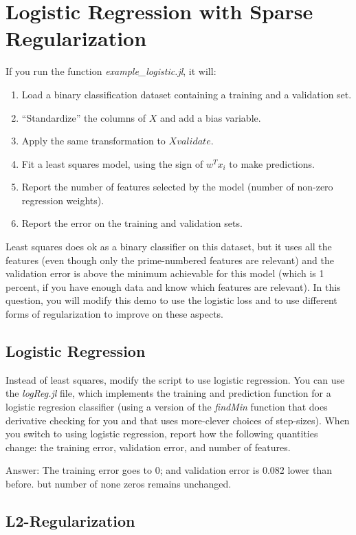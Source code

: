 \documentclass{article}
\def\ans#1{\par\gre{Answer: #1}}
\def\blu#1{{\color{blu}#1}}
\def\gre#1{{\color{gre}#1}}
\def\enum#1{\begin{enumerate}#1\end{enumerate}}
\begin{document}
\section{Logistic Regression with Sparse Regularization}

If you run the function \emph{example\_logistic.jl}, it will:
\enum{
\item Load a binary classification dataset containing a training and a validation set.
\item ``Standardize'' the columns of $X$ and add a bias variable.
\item Apply the same transformation to $Xvalidate$.
\item Fit a least squares model, using the sign of $w^Tx_i$ to make predictions.
\item Report the number of features selected by the model (number of non-zero regression weights).
\item Report the error on the training and validation sets.
}
Least squares does ok as a binary classifier on this dataset, but it uses all the features (even though only the prime-numbered features are relevant) and the validation error is above the minimum achievable for this model (which is 1 percent, if you have enough data and know which features are relevant). In this question, you will modify this demo to use the logistic loss and to use different forms of regularization to improve on these aspects.


\subsection{Logistic Regression}

Instead of least squares, modify the script to use logistic regression. You can use the \emph{logReg.jl} file, which implements the training and prediction function for a logistic regresion classifier (using a  version of the \emph{findMin} function that does derivative checking for you and that uses more-clever choices of step-sizes). When you switch to using logistic regression, \blu{report how the following quantities change: the training error, validation error, and number of features}.
\ans{
    The training error goes to 0; and validation error is 0.082 lower than before. but number of none zeros remains unchanged.
}
\subsection{L2-Regularization}
\end{document}
